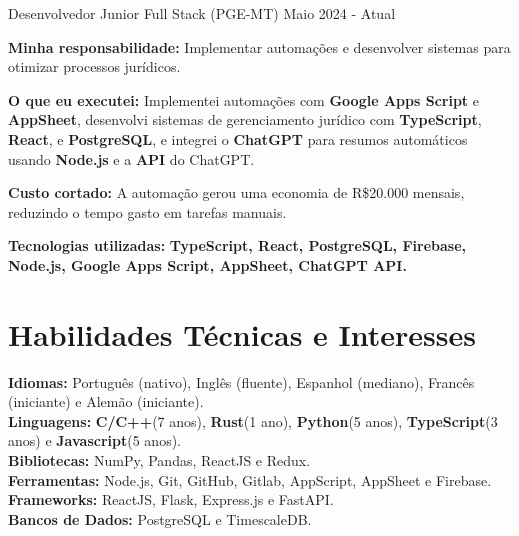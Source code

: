 \vspace{-2mm}

\resumeSubheading
{ Desenvolvedor Junior Full Stack (PGE-MT)}{}
{}{Maio 2024 - Atual}
\vspace{-2.0mm}
\resumeItemListStart
\item \textbf{Minha responsabilidade:} Implementar automações e desenvolver sistemas para otimizar processos jurídicos.
\item \textbf{O que eu executei:} Implementei automações com \textbf{Google Apps Script} e \textbf{AppSheet}, desenvolvi sistemas de gerenciamento jurídico com \textbf{TypeScript}, \textbf{React}, e \textbf{PostgreSQL}, e integrei o \textbf{ChatGPT} para resumos automáticos usando \textbf{Node.js} e a \textbf{API} do ChatGPT.
\item \textbf{Custo cortado:} A automação gerou uma economia de R\$20.000 mensais, reduzindo o tempo gasto em tarefas manuais.
\item \textbf{Tecnologias utilizadas:} \textbf{TypeScript, React, PostgreSQL, Firebase, Node.js, Google Apps Script, AppSheet, ChatGPT API.}
\resumeItemListEnd

\vspace{-5.5mm}
\resumeSubHeadingListEnd

\section{\textbf{Habilidades Técnicas e Interesses}}
\begin{itemize}[leftmargin=0.05in, label={}]
    \small{\item{
          \textbf{Idiomas:}{ Português (nativo), Inglês (fluente), Espanhol (mediano), Francês (iniciante) e Alemão (iniciante).} \\
          \textbf{Linguagens:}{ \textbf{C/C++}(7 anos), \textbf{Rust}(1 ano), \textbf{Python}(5 anos), \textbf{TypeScript}(3 anos) e \textbf{Javascript}(5 anos). } \\
          \textbf{Bibliotecas:}{ NumPy, Pandas, ReactJS e Redux. }\\
          \textbf{Ferramentas:}{ Node.js, Git, GitHub,  Gitlab, AppScript, AppSheet e Firebase.} \\
          \textbf{Frameworks:}{ ReactJS, Flask, Express.js e FastAPI. } \\
          \textbf{Bancos de Dados:}{ PostgreSQL e TimescaleDB. } \\
          }}
\end{itemize}


